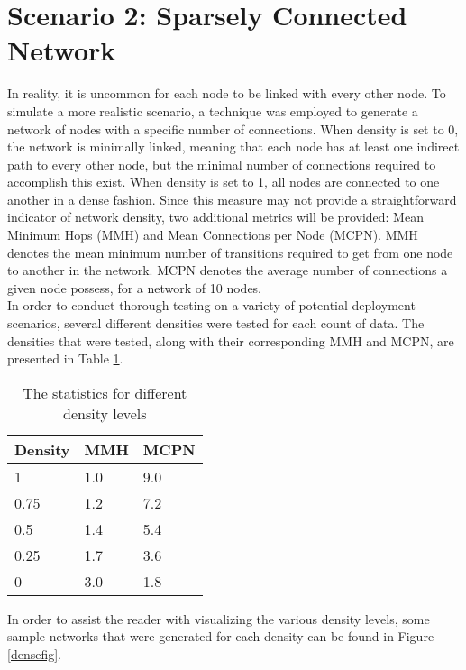 \section{Scenario 2: Sparsely Connected Network}
In reality, it is uncommon for each node to be linked with every other node. To simulate a more realistic scenario, a technique was employed to generate a network of nodes with a specific number of connections. When density is set to 0, the network is minimally linked, meaning that each node has at least one indirect path to every other node, but the minimal number of connections required to accomplish this exist. When density is set to 1, all nodes are connected to one another in a dense fashion. Since this measure may not provide a straightforward indicator of network density, two additional metrics will be provided:  Mean Minimum Hops (MMH) and Mean Connections per Node (MCPN). MMH denotes the mean minimum number of transitions required to get from one node to another in the network. MCPN denotes the average number of connections a given node possess, for a network of 10 nodes. \\

In order to conduct thorough testing on a variety of potential deployment scenarios, several different densities were tested for each count of data. The densities that were tested, along with their corresponding MMH and MCPN, are presented in Table \ref{sparsedensities}.

\begin{table}[H]
	\centering
	\begin{tabular}{l|l|l}
		Density & MMH & MCPN \\ \hline
		1 & 1.0 & 9.0 \\
		0.75    & 1.2 & 7.2  \\
		0.5    & 1.4 & 5.4  \\
		0.25    & 1.7 & 3.6  \\
		0    & 3.0 & 1.8  \\
	\end{tabular}
	\caption{The statistics for different density levels} \label{sparsedensities}
\end{table}

In order to assist the reader with visualizing the various density levels, some sample networks that were generated for each density can be found in Figure \ref{densefig}.

